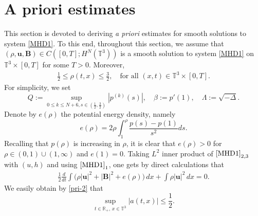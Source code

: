 \documentclass[12pt, reqno]{amsart}
\numberwithin{equation}{section}
\numberwithin{equation}{section}
\numberwithin{equation}{section}
\numberwithin{equation}{section}
\theoremstyle{remark}
\def\T{ \mathbb{T} }
\newcommand{\R}{{\mathbb{R}}}
\def\u{ \mathbf{u} }
\def\b{ \mathbf{B} }
\def\T{ \mathbb{T} }
\begin{document}



\section{ A priori estimates}
\label{sec3}
This section is devoted to deriving \emph{a priori} estimates for smooth solutions to system \eqref{MHD1}. To this end, throughout this section, we assume that $(\rho,\u,\b)\in C([0,T];H^{N}(\mathbb T^3))$ is a smooth solution to system \eqref{MHD1} on $\mathbb T^3\times[0,T]$ for some $T>0$. Moreover,
\begin{equation}\begin{split}\label{pri-2}
		\frac{1}{2}\le \rho(t,x) \le \frac32, \quad \text{for all } (x,t)\in\mathbb T^3\times[0,T].
\end{split}\end{equation}
For simplicity, we set
$$
Q:=\sup_{0\leq k\leq
N+6,s\in(\frac12,\frac32)}|p^{(k)}(s)|,\quad\beta:=p'(1),\quad \Lambda:=\sqrt{-\Delta}.
$$
Denote by $e(\rho)$ the potential energy density, namely
$$
e(\rho)=2\rho\int_{1}^\rho\frac{p(s)-p(1)}{s^2}ds.
$$
Recalling that $p(\rho)$ is increasing in $\rho$, it is clear that $e(\rho)>0$ for $\rho\in(0,1)\cup(1,\infty)$ and $e(1)=0$.
Taking $L^2$ inner product of $\eqref{MHD1}_{2,3}$ with $(u,h)$ and using $\eqref{MHD1}_1$, one gets by direct calculations that
\begin{equation}\begin{split}\label{pri-1}
\frac12\frac{d}{dt}\int\Big(\rho|\u|^2+|\b|^2+e(\rho)\Big)\,dx+\int\rho|\u|^2\,dx=0.
\end{split}\end{equation}
We easily obtain by \eqref{pri-2} that
\begin{equation*}%
\sup_{t\in\R_+,\, x\in\T^3} |a(t,x)|\leq \frac12.
\end{equation*}
\end{document}

